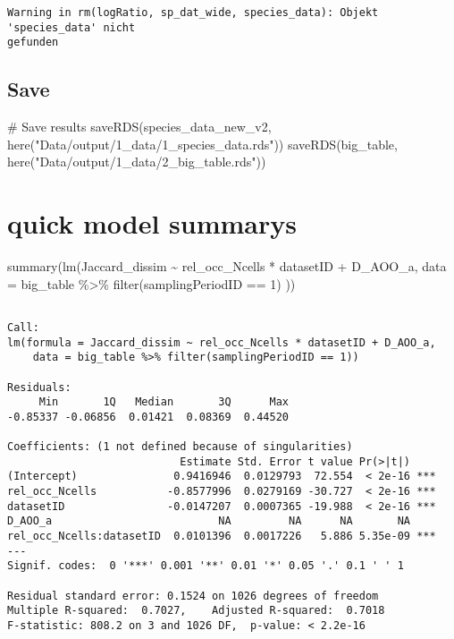\documentclass[
  letterpaper,
  DIV=11,
  numbers=noendperiod]{scrreprt}
\newenvironment{Shaded}{\begin{snugshade}}{\end{snugshade}}
\newcommand{\AttributeTok}[1]{\textcolor[rgb]{0.40,0.45,0.13}{#1}}
\newcommand{\CommentTok}[1]{\textcolor[rgb]{0.37,0.37,0.37}{#1}}
\newcommand{\DecValTok}[1]{\textcolor[rgb]{0.68,0.00,0.00}{#1}}
\newcommand{\FunctionTok}[1]{\textcolor[rgb]{0.28,0.35,0.67}{#1}}
\newcommand{\NormalTok}[1]{\textcolor[rgb]{0.00,0.23,0.31}{#1}}
\newcommand{\SpecialCharTok}[1]{\textcolor[rgb]{0.37,0.37,0.37}{#1}}
\newcommand{\StringTok}[1]{\textcolor[rgb]{0.13,0.47,0.30}{#1}}
\begin{document}
\begin{verbatim}
Warning in rm(logRatio, sp_dat_wide, species_data): Objekt 'species_data' nicht
gefunden
\end{verbatim}

\hypertarget{save}{%
\subsection{Save}\label{save}}

\begin{Shaded}
\begin{Highlighting}[]
\CommentTok{\# Save results}
\FunctionTok{saveRDS}\NormalTok{(species\_data\_new\_v2, }\FunctionTok{here}\NormalTok{(}\StringTok{"Data/output/1\_data/1\_species\_data.rds"}\NormalTok{))}
\FunctionTok{saveRDS}\NormalTok{(big\_table, }\FunctionTok{here}\NormalTok{(}\StringTok{"Data/output/1\_data/2\_big\_table.rds"}\NormalTok{))}
\end{Highlighting}
\end{Shaded}

\hypertarget{quick-model-summarys}{%
\section{quick model summarys}\label{quick-model-summarys}}

\begin{Shaded}
\begin{Highlighting}[]
\FunctionTok{summary}\NormalTok{(}\FunctionTok{lm}\NormalTok{(Jaccard\_dissim }\SpecialCharTok{\textasciitilde{}}\NormalTok{ rel\_occ\_Ncells }\SpecialCharTok{*}\NormalTok{ datasetID }\SpecialCharTok{+}\NormalTok{ D\_AOO\_a,}
           \AttributeTok{data =}\NormalTok{ big\_table }\SpecialCharTok{\%\textgreater{}\%}
             \FunctionTok{filter}\NormalTok{(samplingPeriodID }\SpecialCharTok{==} \DecValTok{1}\NormalTok{)}
\NormalTok{))}
\end{Highlighting}
\end{Shaded}

\begin{verbatim}

Call:
lm(formula = Jaccard_dissim ~ rel_occ_Ncells * datasetID + D_AOO_a,
    data = big_table %>% filter(samplingPeriodID == 1))

Residuals:
     Min       1Q   Median       3Q      Max
-0.85337 -0.06856  0.01421  0.08369  0.44520

Coefficients: (1 not defined because of singularities)
                           Estimate Std. Error t value Pr(>|t|)
(Intercept)               0.9416946  0.0129793  72.554  < 2e-16 ***
rel_occ_Ncells           -0.8577996  0.0279169 -30.727  < 2e-16 ***
datasetID                -0.0147207  0.0007365 -19.988  < 2e-16 ***
D_AOO_a                          NA         NA      NA       NA
rel_occ_Ncells:datasetID  0.0101396  0.0017226   5.886 5.35e-09 ***
---
Signif. codes:  0 '***' 0.001 '**' 0.01 '*' 0.05 '.' 0.1 ' ' 1

Residual standard error: 0.1524 on 1026 degrees of freedom
Multiple R-squared:  0.7027,    Adjusted R-squared:  0.7018
F-statistic: 808.2 on 3 and 1026 DF,  p-value: < 2.2e-16
\end{verbatim}
\end{document}
